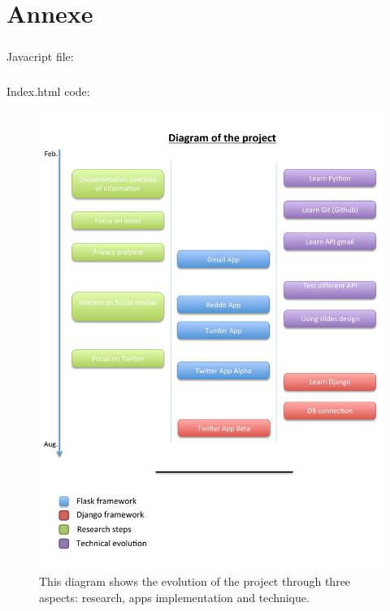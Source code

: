 \chapter*{Annexe}

\paragraph{}
Javacript file:


\paragraph{}
Index.html code:


\begin{figure}[h]
\centering 
\includegraphics[width=1\columnwidth]{images/diagram_f} 
\caption[Project Diagram]{ This diagram shows the evolution of the project through three aspects: research,  apps implementation and technique.}
\label{fig:a_diagram} 
\end{figure}



